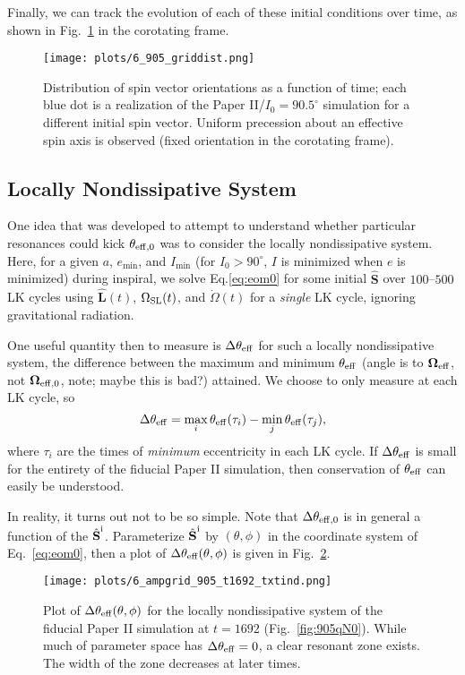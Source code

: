 \documentclass[11pt,
        usenames, %
        dvipsnames %
    ]{article}
\newcommand*{\bm}[1]{\boldsymbol{\mathbf{#1}}}
\newcommand*{\uv}[1]{\hat{\bm{#1}}}
\begin{document}
Finally, we can track the evolution of each of these initial conditions over
time, as shown in Fig.~\ref{fig:griddist_corot} in the corotating frame.
\begin{figure}
    \centering
    \texttt{[image: plots/6\_905\_griddist.png]}
    \caption{Distribution of spin vector orientations as a function of time;
    each blue dot is a realization of the Paper II/$I_0 = 90.5^\circ$ simulation
    for a different initial spin vector. Uniform precession about an effective
    spin axis is observed (fixed orientation in the corotating
    frame).}\label{fig:griddist_corot}
\end{figure}

\subsection{Locally Nondissipative System}

One idea that was developed to attempt to understand whether particular
resonances could kick $\theta_{\rm eff, 0}$ was to consider the locally
nondissipative system. Here, for a given $a$, $e_{\min}$, and $I_{\min}$ (for
$I_0 > 90^\circ$, $I$ is minimized when $e$ is minimized) during inspiral, we
solve Eq.\eqref{eq:eom0} for some initial $\uv{S}$ over $100$--$500$ LK cycles
using $\uv{L}(t)$, $\Omega_{\rm SL}(t)$, and $\dot{\Omega}(t)$ for a
\emph{single} LK cycle, ignoring gravitational radiation.

One useful quantity then to measure is $\Delta \theta_{\rm eff}$ for such a
locally nondissipative system, the difference between the maximum and minimum
$\theta_{\rm eff}$ (angle is to $\bm{\Omega}_{\rm eff}$, not $\bm{ \Omega}_{\rm
eff, 0}$, note; maybe this is bad?) attained. We choose to only measure at each
LK cycle, so
\begin{equation}
    \Delta \theta_{\rm eff} = \max\limits_i \theta_{\rm eff}(\tau_i)
        - \min\limits_j \theta_{\rm eff}(\tau_j),
\end{equation}
where $\tau_i$ are the times of \emph{minimum} eccentricity in each LK cycle.
If $\Delta \theta_{\rm eff}$ is small for the entirety of the fiducial Paper
II simulation, then conservation of $\theta_{\rm eff}$ can easily be
understood.

In reality, it turns out not to be so simple. Note that $\Delta \theta_{\rm eff,
0}$ is in general a function of the $\uv{S}^{\rm i}$. Parameterize $\uv{S}^{\rm
i}$ by $(\theta, \phi)$ in the coordinate system of Eq.~\eqref{eq:eom0}, then a
plot of $\Delta \theta_{\rm eff}(\theta, \phi)$ is given in
Fig.~\ref{fig:ampgridt1692}.
\begin{figure}
    \centering
    \texttt{[image: plots/6\_ampgrid\_905\_t1692\_txtind.png]}
    \caption{Plot of $\Delta \theta_{\rm eff}(\theta, \phi)$ for the locally
    nondissipative system of the fiducial Paper II simulation at $t = 1692$
    (Fig.~\ref{fig:905qN0}). While much of parameter space has $\Delta
    \theta_{\rm eff} = 0$, a clear resonant zone exists. The width of the
    zone decreases at later times.}\label{fig:ampgridt1692}
\end{figure}
\end{document}
